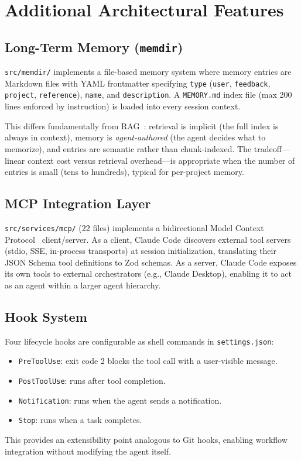 \documentclass{article}
\newcommand{\file}[1]{\texttt{\small #1}}
\newcommand{\code}[1]{\texttt{#1}}
\begin{document}
\section{Additional Architectural Features}
\label{sec:misc}

\subsection{Long-Term Memory (\texttt{memdir})}

\file{src/memdir/} implements a file-based memory system where memory entries are Markdown files with YAML frontmatter specifying \code{type} (\code{user}, \code{feedback}, \code{project}, \code{reference}), \code{name}, and \code{description}. A \code{MEMORY.md} index file (max 200 lines enforced by instruction) is loaded into every session context.

This differs fundamentally from RAG~\cite{lewis2020retrieval}: retrieval is implicit (the full index is always in context), memory is \emph{agent-authored} (the agent decides what to memorize), and entries are semantic rather than chunk-indexed. The tradeoff---linear context cost versus retrieval overhead---is appropriate when the number of entries is small (tens to hundreds), typical for per-project memory.

\subsection{MCP Integration Layer}

\file{src/services/mcp/} (22 files) implements a bidirectional Model Context Protocol~\cite{anthropic2024mcp} client/server. As a client, Claude Code discovers external tool servers (stdio, SSE, in-process transports) at session initialization, translating their JSON Schema tool definitions to Zod schemas. As a server, Claude Code exposes its own tools to external orchestrators (e.g., Claude Desktop), enabling it to act as an agent within a larger agent hierarchy.

\subsection{Hook System}

Four lifecycle hooks are configurable as shell commands in \file{settings.json}:
\begin{itemize}
  \item \code{PreToolUse}: exit code 2 blocks the tool call with a user-visible message.
  \item \code{PostToolUse}: runs after tool completion.
  \item \code{Notification}: runs when the agent sends a notification.
  \item \code{Stop}: runs when a task completes.
\end{itemize}
This provides an extensibility point analogous to Git hooks, enabling workflow integration without modifying the agent itself.
\end{document}
